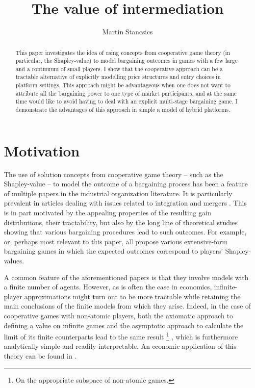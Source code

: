 \documentclass[a4paper]{article}
\title{The value of intermediation}
\author{Martin Stancsics}
\begin{document}
\maketitle

\begin{abstract}
    This paper investigates the idea of using concepts from cooperative game theory (in particular, the Shapley-value) to model bargaining outcomes in games with a few large and a continuum of small players.
    I show that the cooperative approach can be a tractable alternative of explicitly modelling price structures and entry choices in platform settings.
    This approach might be advantageous when one does not want to attribute all the bargaining power to one type of market participants, and at the same time would like to avoid having to deal with an explicit multi-stage bargaining game.
    I demonstrate the advantages of this approach in simple a model of hybrid platforms.
\end{abstract}


\section{Motivation}

The use of solution concepts from cooperative game theory -- such as the Shapley-value -- to model the outcome of a bargaining process has been a feature of multiple papers in the industrial organization literature.
It is particularly prevalent in articles dealing with issues related to integration and mergers \parencite[e.g.][]{hart1990property,segal2003collusion,inderst2003bargaining,montez2007downstream}.
This is in part motivated by the appealing properties of the resulting gain distributions, their tractability, but also by the long line of theoretical studies showing that various bargaining procedures lead to such outcomes.
For example, \textcite{gul1989bargaining,winter1994demand,hart1996bargaining,inderst2003bargaining,} or, perhaps most relevant to this paper, \textcite{stole1996intra} all propose various extensive-form bargaining games in which the expected outcomes correspond to players' Shapley-values.

A common feature of the aforementioned papers is that they involve models with a finite number of agents.
However, as is often the case in economics, infinite-player approximations might turn out to be more tractable while retaining the main conclusions of the finite models from which they arise.
Indeed, in the case of cooperative games with non-atomic players, both the axiomatic approach to defining a value on infinite games and the asymptotic approach to calculate the limit of its finite counterparts lead to the same result \footnote{
    On the appropriate subspace of non-atomic games.
} \parencite{aumann2015values}, which is furthermore analytically simple and readily interpretable. An economic application of this theory can be found in \textcite{billera1978internal}.
\end{document}

